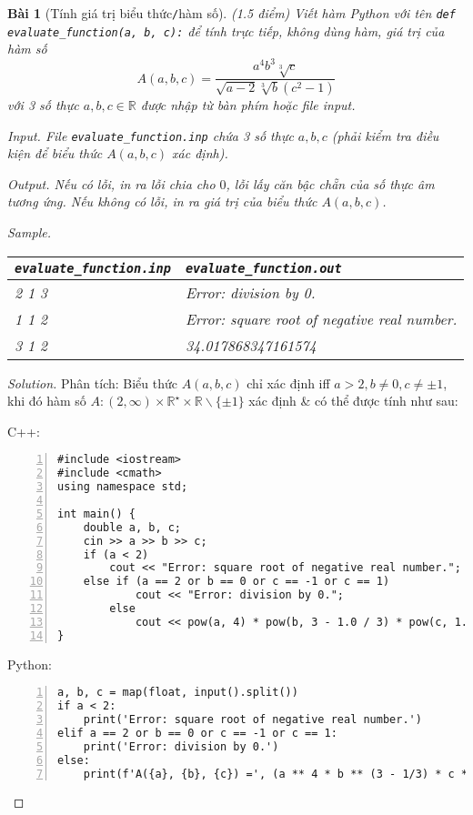 \documentclass{article}
\newtheorem{baitoan}{Bài}
\begin{document}
\begin{baitoan}[Tính giá trị biểu thức{\tt/}hàm số]
	{\rm(1.5 điểm)} Viết hàm Python với tên \verb|def evaluate_function(a, b, c):| để tính trực tiếp, không dùng hàm, giá trị của hàm số
	\begin{equation*}
		A(a,b,c) = \frac{a^4b^3\sqrt[3]{c}}{\sqrt{a - 2}\sqrt[3]{b}(c^2 - 1)}
	\end{equation*}
	với 3 số thực $a,b,c\in\mathbb{R}$ được nhập từ bàn phím hoặc file input.
	\item {\sf Input.} File \verb|evaluate_function.inp| chứa 3 số thực $a,b,c$ (phải kiểm tra điều kiện để biểu thức $A(a,b,c)$ xác định).
	\item {\sf Output.} Nếu có lỗi, in ra lỗi chia cho $0$, lỗi lấy căn bậc chẵn của số thực âm tương ứng. Nếu không có lỗi, in ra giá trị của biểu thức $A(a,b,c)$.
	\item {\sf Sample.}
	\begin{table}[H]
		\centering
		\begin{tabular}{|l|l|}
			\hline
			\verb|evaluate_function.inp| & \verb|evaluate_function.out| \\
			\hline
			2 1 3 & Error: division by 0. \\
            \hline
			1 1 2 & Error: square root of negative real number. \\
             \hline
			3 1 2 & 34.017868347161574 \\
			\hline
		\end{tabular}
	\end{table}
\end{baitoan}

\begin{proof}[Solution]
    Phân tích: Biểu thức $A(a,b,c)$ chỉ xác định iff $a > 2,b\ne0,c\ne\pm1$, khi đó hàm số $A:(2,\infty)\times\mathbb{R}^\star\times\mathbb{R}\backslash\{\pm1\}$ xác định \& có thể được tính như sau:
    
    C++:
    \begin{Verbatim}[numbers=left,xleftmargin=5mm]
#include <iostream>
#include <cmath>
using namespace std;

int main() {
    double a, b, c;
    cin >> a >> b >> c;
    if (a < 2)
        cout << "Error: square root of negative real number.";
    else if (a == 2 or b == 0 or c == -1 or c == 1)
            cout << "Error: division by 0.";
        else
            cout << pow(a, 4) * pow(b, 3 - 1.0 / 3) * pow(c, 1.0 / 3) * 1.0 / (sqrt(a - 2) * (c * c - 1));
}
    \end{Verbatim}    
    Python:
    \begin{Verbatim}[numbers=left,xleftmargin=5mm]
a, b, c = map(float, input().split())
if a < 2:
    print('Error: square root of negative real number.')
elif a == 2 or b == 0 or c == -1 or c == 1:
    print('Error: division by 0.')
else:
    print(f'A({a}, {b}, {c}) =', (a ** 4 * b ** (3 - 1/3) * c ** (1/3)) / (sqrt(a - 2) * (c ** 2 - 1)))
    \end{Verbatim}
\end{proof}
\end{document}
